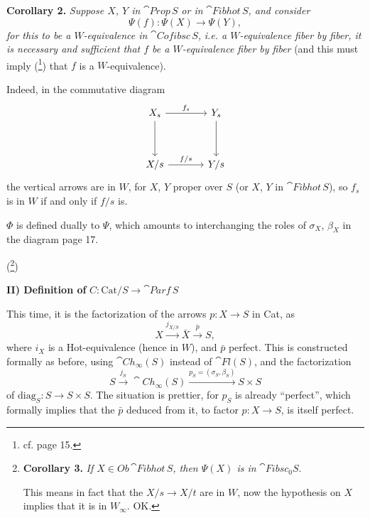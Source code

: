 \textbf{Corollary 2.} \textit{Suppose $X$, $Y$ in} $\cat{Prop}\,S$ \textit{or in} $\cat{Fibhot}\,S$\textit{, and consider}
\[
\Psi(f) : \Psi(X) \longrightarrow \Psi(Y),
\]
\textit{for this to be a $W$-equivalence in} $\cat{Cofibsc}\,S$\textit{,}
\textit{i.e. a $W$-equivalence fiber by fiber, it is necessary and sufficient that $f$ be a $W$-equivalence fiber by fiber} (and this must imply (\footnote[12]{cf.  page 15.}) that $f$ is a $W$-equivalence).

Indeed, in the commutative diagram
\[
\begin{tikzcd}[column sep=large, row sep=huge]
X_s \arrow[r, "f_s"] \arrow[d] & Y_s \arrow[d] \\
X/s \arrow[r, "f/s"] & Y/s
\end{tikzcd}
\]
the vertical arrows are in $W$, for $X$, $Y$ proper over $S$ (or $X$, $Y$ in $\cat{Fibhot}\,S$), so $f_s$ is in $W$ if and only if $f/s$ is.

 $\Phi$ is defined dually to $\Psi$, which amounts to interchanging the roles of $\sigma_X$, $\beta_X$ in the diagram page 17.

(\footnote[13]{\textbf{Corollary 3.} \textit{If $X \in \mathit{Ob}\,$}$\cat{Fibhot}\,S$\textit{, then $\Psi(X)$ is in} $\cat{Fibsc}_0S$.\par This means in fact that the $X/s \longrightarrow X/t$ are in $W$, now the hypothesis on $X$ implies that it is in $W_\infty$. OK.})

\textbf{II) Definition of} $C : \mathrm{Cat}/S \longrightarrow \cat{Parf}\,S$

This time, it is the factorization of the arrows $p : X \longrightarrow S$ in Cat, as
\[
X \xrightarrow{j_{X/S}} \bar{X} \xrightarrow{\bar{p}} S,
\]
where $i_X$ is a Hot-equivalence (hence in $W$), and $\bar{p}$ perfect. This is constructed formally as before, using $\cat{Ch}_\infty(S)$ instead of $\cat{Fl}(S)$, and the factorization
\[
S \xrightarrow{j_S} \cat{Ch}_\infty(S) \xrightarrow{p_S=(\sigma_S,\beta_S)} S \times S
\]
of $\mathrm{diag}_S : S \longrightarrow S \times S$. The situation is prettier, for $p_S$ is already ``perfect'', which formally implies that the $\bar{p}$ deduced from it, to factor $p : X \longrightarrow S$, is itself perfect.
